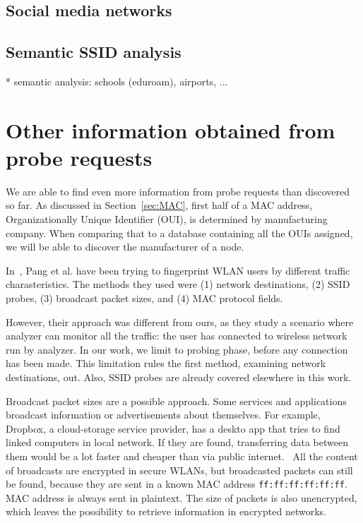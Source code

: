 \documentclass[12pt,a4paper,oneside,pdftex]{report}
\begin{document}
\subsection{Social media networks}
\label{subsec:social_media}

\subsection{Semantic SSID analysis}
* semantic analysis: schools (eduroam), airports, ...

\section{Other information obtained from probe requests}
\label{sec:other_info}

We are able to find even more information from probe requests than discovered so far. As discussed in Section~\ref{sec:MAC}, first half of a MAC address, Organizationally Unique Identifier (OUI), is determined by manufacturing company. When comparing that to a database containing all the OUIs assigned, we will be able to discover the manufacturer of a node.

In~\cite{pang2007802}, Pang et al. have been trying to fingerprint WLAN users by different traffic charasteristics. The methods they used were (1) network destinations, (2) SSID probes, (3) broadcast packet sizes, and (4) MAC protocol fields. 

However, their approach was different from ours, as they study a scenario where analyzer can monitor all the traffic: the user has connected to wireless network run by analyzer. In our work, we limit to probing phase, before any connection has been made. This limitation rules the first method, examining network destinations, out. Also, SSID probes are already covered elsewhere in this work.

Broadcast packet sizes are a possible approach. Some services and applications broadcast information or advertisements about themselves. For example, Dropbox, a cloud-storage service provider, has a deskto app that tries to find linked computers in local network. If they are found, transferring data between them would be a lot faster and cheaper than via public internet.~\cite{dropboxlan} All the content of broadcasts are encrypted in secure WLANs, but broadcasted packets can still be found, because they are sent in a known MAC address \texttt{ff:ff:ff:ff:ff:ff}. MAC address is always sent in plaintext. The size of packets is also unencrypted, which leaves the possibility to retrieve information in encrypted networks.
\end{document}
